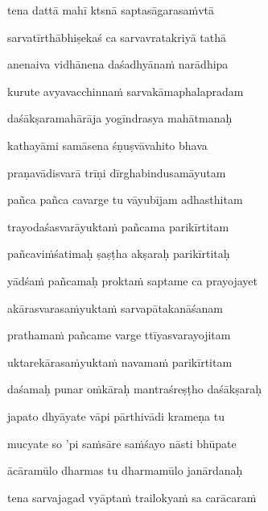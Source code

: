 tena dattā mahī ktsnā saptasāgarasa\.mvtā\thinspace{\dandab} \dontdisplaylinenum

sarvatīrthābhiṣekaś ca sarvavratakriyā tathā \veg\dontdisplaylinenum

anenaiva vidhānena daśadhyāna\.m narādhipa\thinspace{\dandab} \dontdisplaylinenum

kurute avyavacchinna\.m sarvakāmaphalapradam \veg\dontdisplaylinenum


daśākṣaramahārāja yogīndrasya mahātmanaḥ\thinspace{\dandab} \dontdisplaylinenum

kathayāmi samāsena śṇuṣvāvahito bhava \veg\dontdisplaylinenum

praṇavādisvarā trīṇi dīrghabindusamāyutam\thinspace{\dandab} \dontdisplaylinenum

pañca pañca cavarge tu vāyubījam adhasthitam \veg\dontdisplaylinenum

trayodaśasvarāyukta\.m pañcama parikīrtitam\thinspace{\dandab} \dontdisplaylinenum

pañcavi\.mśatimaḥ ṣaṣṭha akṣaraḥ parikīrtitaḥ \veg\dontdisplaylinenum

yādśa\.m pañcamaḥ prokta\.m saptame ca prayojayet\thinspace{\dandab} \dontdisplaylinenum

akārasvarasa\.myukta\.m sarvapātakanāśanam \veg\dontdisplaylinenum

prathama\.m pañcame varge ttīyasvarayojitam\thinspace{\dandab} \dontdisplaylinenum

uktarekārasa\.myukta\.m navama\.m parikīrtitam \veg\dontdisplaylinenum

daśamaḥ punar o\.mkāraḥ mantraśreṣṭho daśākṣaraḥ\thinspace{\dandab} \dontdisplaylinenum

japato dhyāyate vāpi pārthivādi krameṇa tu \veg\dontdisplaylinenum

mucyate so 'pi sa\.msāre sa\.mśayo nāsti bhūpate\thinspace{\dandab} \dontdisplaylinenum

ācāramūlo dharmas tu dharmamūlo janārdanaḥ \danda\dontdisplaylinenum

tena sarvajagad vyāpta\.m trailokya\.m sa carācara\.m \veg\dontdisplaylinenum


